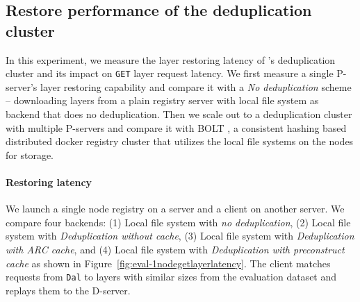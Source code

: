 

\subsection{Restore performance of the deduplication cluster}
\label{sec:eval-dedup}




In this experiment, we measure the layer restoring latency of \sysname's deduplication cluster 
and its impact on \texttt{GET} layer request latency.
We first measure a single P-server's layer restoring capability and compare it with 
a \emph{No deduplication} scheme -- 
downloading layers from a plain registry server with local file system as backend
that does no deduplication.
Then we scale out to a deduplication cluster with multiple P-servers
and compare it with BOLT \cite{littley2019bolt}, 
a consistent hashing based distributed docker registry cluster 
that utilizes the local file systems on the nodes for storage.
%
%

\paragraph{Restoring latency}
We launch a single node registry on a server and 
a client on another server.
We compare four backends:
(1) Local file system with \emph{no deduplication},
(2) Local file system with \sysname \emph{Deduplication without cache},
(3) Local file system with \sysname \emph{Deduplication with ARC cache}, and
(4) Local file system with \sysname \emph{Deduplication with preconstruct cache}
as shown in Figure~\ref{fig:eval-1nodegetlayerlatency}.
%
The client matches requests from \texttt{Dal} to layers with similar sizes 
from the evaluation dataset and replays them to the D-server.

